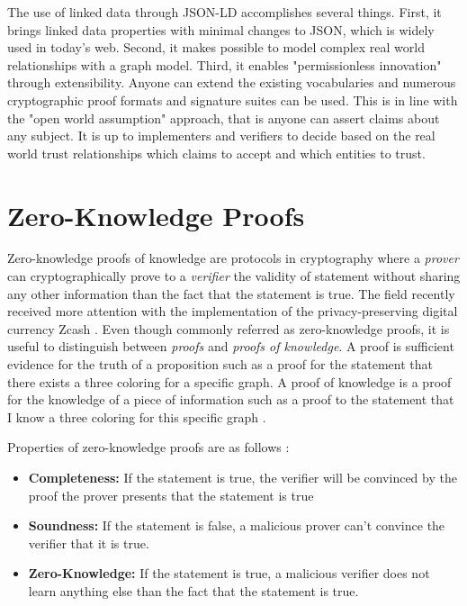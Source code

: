 The use of linked data through JSON-LD accomplishes several things. First, it  brings linked data properties with minimal changes to JSON, which is widely used in today's web. Second, it makes possible to model complex real world relationships with a graph model. Third, it enables "permissionless innovation" through extensibility. Anyone can extend the existing vocabularies and numerous cryptographic proof formats and signature suites can be used. This is in line with the "open world assumption" approach, that is anyone can assert claims about any subject. It is up to implementers and verifiers to decide based on the real world trust relationships which claims to accept and which entities to trust.

\section{Zero-Knowledge Proofs}

Zero-knowledge proofs of knowledge are protocols in cryptography where a \textit{prover} can cryptographically prove to a \textit{verifier} the validity of statement without sharing any other information than the fact that the statement is true. The field recently received more attention with the implementation of the privacy-preserving digital currency Zcash \parencite{E.BenSasson.2016}. Even though commonly referred as zero-knowledge proofs, it is useful to distinguish between \textit{proofs} and \textit{proofs of knowledge}. A proof is sufficient evidence for the truth of a proposition such as a proof for the statement that there exists a three coloring for a specific graph. A proof of knowledge is a proof for the knowledge of a piece of information such as a proof to the statement that I know a three coloring for this specific graph \parencite{green_2017}. 

Properties of zero-knowledge proofs are as follows \parencite{Groth.2010}:
\begin{itemize}
  \item \textbf{Completeness:} If the statement is true, the verifier will be convinced by the proof the prover presents that the statement is true
  \item \textbf{Soundness:} If the statement is false, a malicious prover can't convince the verifier that it is true.
  \item \textbf{Zero-Knowledge:} If the statement is true, a malicious verifier does not learn anything else than the fact that the statement is true.
\end{itemize}

